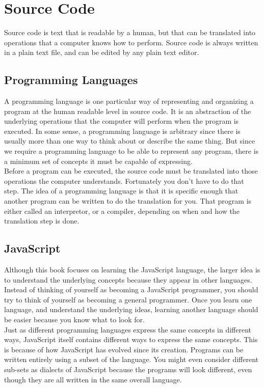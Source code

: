 \chapter{Source Code}


Source code is text that is readable by a human, but that can be translated into operations that a computer knows how to perform. Source code is always written in a plain text file, and can be edited by any plain text editor.

\section{Programming Languages}

A programming language is one particular way of representing and organizing a program at the human readable level in source code. It is an abstraction of the underlying operations that the computer will perform when the program is executed. In some sense, a programming language is arbitrary since there is usually more than one way to think about or describe the same thing. But since we require a programming language to be able to represent any program, there is a minimum set of concepts it must be capable of expressing.\\

Before a program can be executed, the source code must be translated into those operations the computer understands. Fortunately you don't have to do that step. The idea of a programming language is that it is specific enough that another program can be written to do the translation for you. That program is either called an interpretor, or a compiler, depending on when and how the translation step is done.


\section{JavaScript}

Although this book focuses on learning the JavaScript language, the larger idea is to understand the underlying concepts because they appear in other languages. Instead of thinking of yourself as becoming a JavaScript programmer, you should try to think of yourself as becoming a general programmer. Once you learn one language, and understand the underlying ideas, learning another language should be easier because you know what to look for.\\

Just as different programming languages express the same concepts in different ways, JavaScript itself contains different ways to express the same concepts. This is because of how JavaScript has evolved since its creation. Programs can be written entirely using a subset of the language. You might even consider different sub-sets as dialects of JavaScript because the programs will look different, even though they are all written in the same overall language.\\

